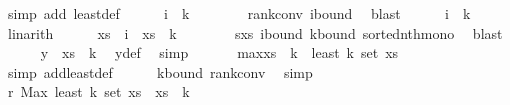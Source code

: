 \begin{isabellebody}
\ {\isacharparenleft}{\kern0pt}simp\ add{\isacharcolon}{\kern0pt}\ least{\isacharunderscore}{\kern0pt}def{\isacharparenright}{\kern0pt}\isanewline
\ \ \ \ \isamarkupfalse%
\ {\isachardoublequoteopen}i\ {\isacharless}{\kern0pt}\ k{\isacharplus}{\kern0pt}{}{\isachardoublequoteclose}\isanewline
\ \ \ \ \ \ \isamarkupfalse%
\ rank{\isacharunderscore}{\kern0pt}conv\ i{\isacharunderscore}{\kern0pt}bound\ \isamarkupfalse%
\ blast\isanewline
\ \ \ \ \isamarkupfalse%
\ {\isachardoublequoteopen}i\ {\isasymle}\ k{\isachardoublequoteclose}\ \isamarkupfalse%
\ linarith\isanewline
\ \ \ \ \isamarkupfalse%
\ {\isachardoublequoteopen}xs\ {\isacharbang}{\kern0pt}\ i\ {\isasymle}\ xs\ {\isacharbang}{\kern0pt}\ k{\isachardoublequoteclose}\isanewline
\ \ \ \ \ \ \isamarkupfalse%
\ s{\isacharunderscore}{\kern0pt}xs\ i{\isacharunderscore}{\kern0pt}bound\ k{\isacharunderscore}{\kern0pt}bound\ sorted{\isacharunderscore}{\kern0pt}nth{\isacharunderscore}{\kern0pt}mono\ \isamarkupfalse%
\ blast\isanewline
\ \ \ \ \isamarkupfalse%
\ {\isachardoublequoteopen}y\ {\isasymle}\ xs\ {\isacharbang}{\kern0pt}\ k{\isachardoublequoteclose}\ \isamarkupfalse%
\ y{\isacharunderscore}{\kern0pt}def\ \isamarkupfalse%
\ simp\isanewline
\ \ \isamarkupfalse%
\isanewline
\isanewline
\ \ \isamarkupfalse%
\ max{\isacharunderscore}{\kern0pt}{}{\isacharcolon}{\kern0pt}{\isachardoublequoteopen}xs\ {\isacharbang}{\kern0pt}\ k\ {\isasymin}\ least\ {\isacharparenleft}{\kern0pt}k{\isacharplus}{\kern0pt}{}{\isacharparenright}{\kern0pt}\ {\isacharparenleft}{\kern0pt}set\ xs{\isacharparenright}{\kern0pt}{\isachardoublequoteclose}\isanewline
\ \ \ \ \isamarkupfalse%
\ {\isacharparenleft}{\kern0pt}simp\ add{\isacharcolon}{\kern0pt}least{\isacharunderscore}{\kern0pt}def{\isacharparenright}{\kern0pt}\isanewline
\ \ \ \ \isamarkupfalse%
\ k{\isacharunderscore}{\kern0pt}bound\ rank{\isacharunderscore}{\kern0pt}conv\ \isamarkupfalse%
\ simp\isanewline
\isanewline
\ \ \isamarkupfalse%
\ r{\isacharunderscore}{\kern0pt}{}{\isacharcolon}{\kern0pt}\ {\isachardoublequoteopen}Max\ {\isacharparenleft}{\kern0pt}least\ {\isacharparenleft}{\kern0pt}k{\isacharplus}{\kern0pt}{}{\isacharparenright}{\kern0pt}\ {\isacharparenleft}{\kern0pt}set\ xs{\isacharparenright}{\kern0pt}{\isacharparenright}{\kern0pt}\ {\isacharequal}{\kern0pt}\ xs\ {\isacharbang}{\kern0pt}\ k{\isachardoublequoteclose}\isanewline

\end{isabellebody}
